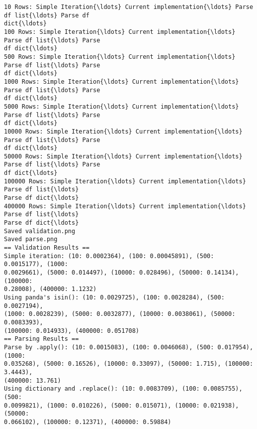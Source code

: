 \documentclass[11pt]{article}
\begin{document}
    \begin{Verbatim}[commandchars=\\\{\}]
10 Rows: Simple Iteration{\ldots} Current implementation{\ldots} Parse df list{\ldots} Parse df
dict{\ldots}
100 Rows: Simple Iteration{\ldots} Current implementation{\ldots} Parse df list{\ldots} Parse
df dict{\ldots}
500 Rows: Simple Iteration{\ldots} Current implementation{\ldots} Parse df list{\ldots} Parse
df dict{\ldots}
1000 Rows: Simple Iteration{\ldots} Current implementation{\ldots} Parse df list{\ldots} Parse
df dict{\ldots}
5000 Rows: Simple Iteration{\ldots} Current implementation{\ldots} Parse df list{\ldots} Parse
df dict{\ldots}
10000 Rows: Simple Iteration{\ldots} Current implementation{\ldots} Parse df list{\ldots} Parse
df dict{\ldots}
50000 Rows: Simple Iteration{\ldots} Current implementation{\ldots} Parse df list{\ldots} Parse
df dict{\ldots}
100000 Rows: Simple Iteration{\ldots} Current implementation{\ldots} Parse df list{\ldots}
Parse df dict{\ldots}
400000 Rows: Simple Iteration{\ldots} Current implementation{\ldots} Parse df list{\ldots}
Parse df dict{\ldots}
Saved validation.png
Saved parse.png
== Validation Results ==
Simple iteration: (10: 0.0002364), (100: 0.00045891), (500: 0.0015177), (1000:
0.0029661), (5000: 0.014497), (10000: 0.028496), (50000: 0.14134), (100000:
0.28008), (400000: 1.1232)
Using panda's isin(): (10: 0.0029725), (100: 0.0028284), (500: 0.0027194),
(1000: 0.0028239), (5000: 0.0032877), (10000: 0.0038061), (50000: 0.0083393),
(100000: 0.014933), (400000: 0.051708)
== Parsing Results ==
Parse by .apply(): (10: 0.0015083), (100: 0.0046068), (500: 0.017954), (1000:
0.035268), (5000: 0.16526), (10000: 0.33097), (50000: 1.715), (100000: 3.4443),
(400000: 13.761)
Using dictionary and .replace(): (10: 0.0083709), (100: 0.0085755), (500:
0.0099821), (1000: 0.010226), (5000: 0.015071), (10000: 0.021938), (50000:
0.066102), (100000: 0.12371), (400000: 0.59884)
    \end{Verbatim}

    \begin{center}
    \end{center}
    { \hspace*{\fill} \\}
    
    \begin{center}
    \end{center}
    { \hspace*{\fill} \\}
    
\end{document}
